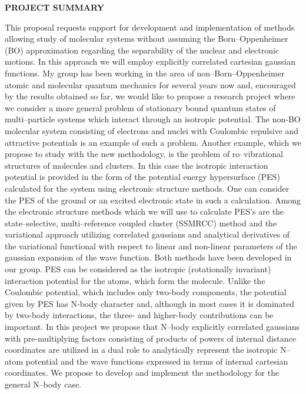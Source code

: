 
\noindent
{\bf PROJECT SUMMARY}

This proposal requests support for development and implementation
of methods allowing study of molecular systems without
assuming the Born--Oppenheimer (BO) approximation regarding the
separability of the nuclear and electronic motions. In this
approach we will employ explicitly  
correlated cartesian gaussian functions.
My group has been working in the area of non--Born--Oppenheimer
atomic and molecular quantum mechanics 
for several years now and, encouraged by the 
results obtained so far, we would like to propose a
research
project where we consider 
a more general problem of stationary bound
quantum states of multi--particle
systems which interact through an isotropic potential.
The non-BO molecular system consisting of electrons and nuclei 
with
Coulombic repulsive and attractive potentials 
is an example of such a problem.
Another example, which we propose to study with
the new methodology, is the problem of ro--vibrational structures
of molecules and clusters. 
In this case the isotropic interaction potential is provided
in the form of the potential energy hypersurface (PES)
calculated for the system using electronic structure methods.
One can consider the PES of the 
ground or an excited electronic state in such a calculation.
Among the electronic structure methods which we will
use to calculate PES's are
the state--selective, multi--reference coupled cluster (SSMRCC)
method and the variational approach utilizing correlated gaussians 
and analytical derivatives of the variational functional with
respect to linear and non-linear parameters of the gaussian
expansion of the wave function.
Both methods have been developed in our group.
PES can be considered as the
isotropic (rotationally invariant) interaction potential
for the atoms, which form the molecule.
Unlike the Coulombic potential, which includes only two-body
components, the potential given by PES has N-body character and,
although in most cases it is dominated by two-body interactions,
the three- and higher-body contributions can be important.
In this project we propose that N--body
explicitly correlated gaussians with pre-multiplying factors consisting of
products of powers of internal distance coordinates are utilized in a dual
role to analytically represent the isotropic N--atom potential and the 
wave functions expressed in terms of internal cartesian coordinates. 
We propose to develop and implement the methodology for the general
N--body case. 

